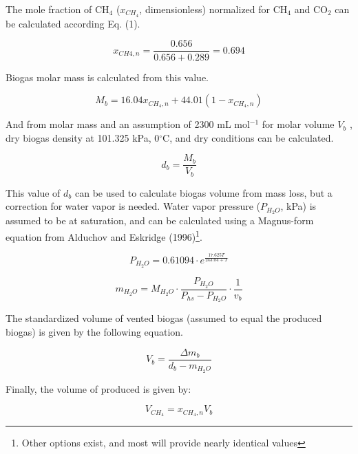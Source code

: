 \documentclass[]{article}
\begin{document}
The mole fraction of CH$_{4}$ ($x_{CH_4}$, dimensionless) normalized for CH$_{4}$ and CO$_{2}$ can be calculated according Eq. (1). 

\begin{equation}
    x_{CH{4},n} = \frac{0.656}{0.656 + 0.289} = 0.694
\end{equation}

Biogas molar mass is calculated from this value.

\begin{equation}
  M_b = 16.04 x_{CH_4,n} + 44.01 (1 - x_{CH_4,n})
\end{equation}

And from molar mass and an assumption of 2300 mL mol$^{-1}$ for molar volume $V_b$ \cite{validation}, dry biogas density at 101.325 kPa, 0$^\circ$C, and dry conditions can be calculated.

\begin{equation}
  d_b=\frac{M_b}{V_b}
\end{equation}

This value of $d_b$ can be used to calculate biogas volume from mass loss, but a correction for water vapor is needed.
Water vapor pressure ($P_{H_2O}$, kPa) is assumed to be at saturation, and can be calculated using a Magnus-form equation from Alduchov and Eskridge (1996)\footnote{
  Other options exist, and most will provide nearly identical values}.

\begin{equation}
\label{eq:2_magnus}
   P_{H_2O} = 0.61094 \cdot e^{\frac{17.625 T}{243.04 + T}}
\end{equation}

\begin{equation}
  \label{eq:5}
  m_{H_2O}=M_{H_2O} \cdot \frac{P_{H_2O}}{P_{hs}-P_{H_2O}} \cdot \frac{1}{v_b}
\end{equation}

The standardized volume of vented biogas (assumed to equal the produced biogas) is given by the following equation.

\begin{equation}
  \label{eq:7}
  V_b = \frac{\Delta m_b}{d_b-m_{H_2O}}
\end{equation}

Finally, the volume of  produced is given by:

\begin{equation}
  \label{eq:ch4m1}
  V_{CH_4} = x_{CH_4, n} V_b
\end{equation}
\end{document}
